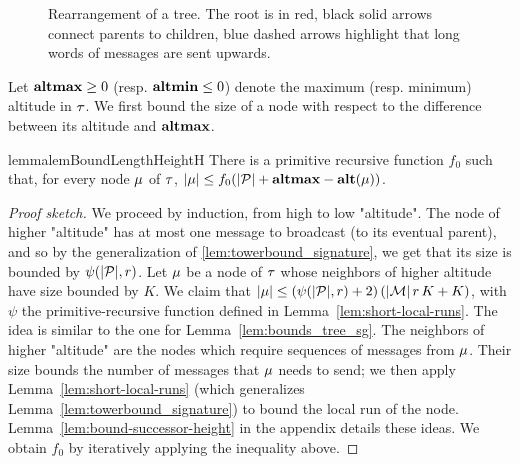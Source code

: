 \begin{figure}[t]
	
	\caption{Rearrangement of a tree. The root is in red, black solid arrows connect parents to children, blue dashed arrows highlight that long words of messages are sent upwards.}
	\label{fig:rearrange-tree}
\end{figure}

Let $\mathbf{altmax} \geq 0$ (resp. $\mathbf{altmin} \leq 0$) denote the maximum (resp. minimum) altitude in $\tau$.
We first bound the size of a node with respect to the difference between its altitude and $\mathbf{altmax}$.

\begin{restatable}{lemma}{lemBoundLengthHeightH}
	\label{lem:bound-length-at-height-h}
	There is a primitive recursive function $f_0$ such that, for every node $\mu$ of $\tau$, $|\mu| \leq f_0(|\mathcal{P}| + \mathbf{altmax} - \mathbf{alt}(\mu))$.
\end{restatable}
\begin{proof}[Proof sketch]
	We proceed by induction, from high to low "altitude". 
	The node of higher "altitude"  has at most one message to broadcast (to its eventual parent), and so by the generalization of \cref{lem:towerbound_signature}, we get that its size is bounded by $\psi(|\mathcal{P}|,r)$.
	Let $\mu$ be a node of $\tau$ whose neighbors of higher altitude have size bounded by $K$.
	We claim that $|\mu| \leq (\psi(|\mathcal{P}|, r)+2) \, (|\mathcal{M}| \, r \, K + K)$, with $\psi$ the primitive-recursive function defined in Lemma~\ref{lem:short-local-runs}. 
	The idea is similar to the one for Lemma~\ref{lem:bounds_tree_sg}. The neighbors of higher "altitude" are the nodes which require sequences of messages from $\mu$. Their size bounds the number of messages that $\mu$ needs to send; we then apply Lemma~\ref{lem:short-local-runs} (which generalizes Lemma~\ref{lem:towerbound_signature}) to bound the local run of the node. Lemma~\ref{lem:bound-successor-height} in the appendix details these ideas.
We obtain $f_0$ by iteratively applying the inequality above.
\end{proof}

